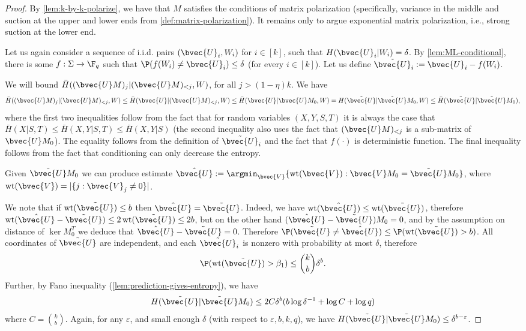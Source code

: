 \documentclass[11pt]{article}
\renewcommand{\H}{\bar{H}}
\newcommand{\wt}{\mathop\mathrm{wt}}
\begin{document}
\begin{proof}
	By \cref{lem:k-by-k-polarize}, we have that $M$ satisfies the conditions of matrix polarization (specifically, variance in the middle and suction at the upper and lower ends from \cref{def:matrix-polarization}). It remains only to argue exponential matrix polarization, i.e., strong suction at the lower end. 
	
	Let us again consider a sequence of i.i.d. pairs $(\bvec{U}_i, W_i)$ for $i \in [k]$, such that $H(\bvec{U}_i | W_i) = \delta$. By \cref{lem:ML-conditional}, there is some $f : \Sigma \to \F_q$ such that $\P(f(W_i) \not= \bvec{U}_i) \leq \delta$ (for every $i\in [k]$). Let us define $\tilde{\bvec{U}}_i := \bvec{U}_i - f(W_i)$.
	
	We will bound $\H( (\bvec{U}M)_j | (\bvec{U}M)_{<j}, W)$, for all $j > (1 - \eta) k$. We have 
	\begin{equation*}
		\H( (\bvec{U}M)_j | (\bvec{U}M)_{<j}, W) \leq \H(\bvec{U} |(\bvec{U}M)_{<j}, W) \leq \H(\bvec{U} | \bvec{U}M_0, W) = H(\tilde{\bvec{U}} | \tilde{\bvec{U}}M_0, W) \leq \H(\tilde{\bvec{U}} | \tilde{\bvec{U}} M_0),
	\end{equation*}
	where the first two inequalities follow from the fact that for random variables $(X, Y, S, T)$ it is always the case that $\H( X | S, T) \leq \H(X, Y | S, T) \leq \H(X, Y | S)$ (the second inequality also uses the fact that $(\bvec{U}M)_{<j}$ is a sub-matrix of $\bvec{U}M_0$). The equality follows from the definition of $\tilde{\bvec{U}}_i$ and the fact that $f(\cdot)$ is  deterministic function. The final inequality follows from the fact that conditioning can only decrease the entropy.
	
	Given $\tilde{\bvec{U}} M_0$ we can produce estimate $\hat{\bvec{U}} := \argmin_{\bvec{V}} \{ \wt(\bvec{V}) : \bvec{V} M_0 = \tilde{\bvec{U}} M_0\}$, where $\wt(\bvec{V}) = |\{j : \bvec{V}_j \not=0 \}|$.
	
	We note that if $\wt(\tilde{\bvec{U}}) \leq b$ then $\hat{\bvec{U}} = \tilde{\bvec{U}}$. Indeed, we have $\wt(\hat{\bvec{U}}) \leq \wt(\tilde{\bvec{U}})$, therefore $\wt(\hat{\bvec{U}} - \tilde{\bvec{U}}) \leq 2 \wt(\tilde{\bvec{U}}) \leq 2 b$, but on the other hand $(\hat{\bvec{U}} - \tilde{\bvec{U}}) M_0 = 0$, and by the assumption on distance of $\ker M_0^T$ we deduce that $\hat{\bvec{U}} - \tilde{\bvec{U}} = 0$. Therefore $\P(\tilde{\bvec{U}} \not= \hat{\bvec{U}}) \leq \P(\wt(\tilde{\bvec{U}}) > b)$. All coordinates of $\tilde{\bvec{U}}$ are independent, and each $\tilde{\bvec{U}}_i$ is nonzero with probability at most $\delta$, therefore
	\begin{equation*}
		\P(\wt(\tilde{\bvec{U}}) > \beta_1) \leq \binom{k}{b} \delta^{b}.
	\end{equation*}
	Further, by Fano inequality (\cref{lem:prediction-gives-entropy}), we have
	\begin{equation*}
		H(\tilde{\bvec{U}} | \tilde{\bvec{U}} M_0) \leq 2 C \delta^{b} (b \log \delta^{-1} +  \log C + \log q )
	\end{equation*}
	where $C = \binom{k}{b}$. Again, for any $\varepsilon$, and small enough $\delta$ (with respect to $\varepsilon, b, k, q$), we have $H(\tilde{\bvec{U}} | \tilde{\bvec{U}} M_0) \leq \delta^{b - \varepsilon}$.
	

\end{proof}
\end{document}
